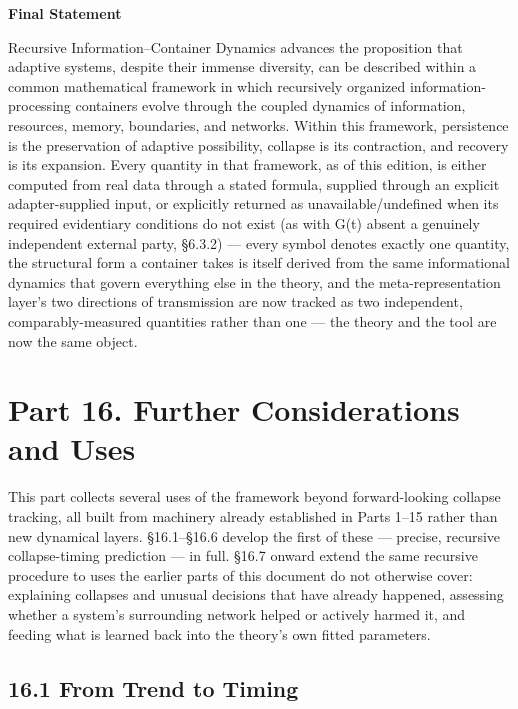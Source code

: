 \documentclass[
]{article}
\begin{document}
\textbf{Final Statement}

Recursive Information--Container Dynamics advances the proposition that
adaptive systems, despite their immense diversity, can be described
within a common mathematical framework in which recursively organized
information-processing containers evolve through the coupled dynamics of
information, resources, memory, boundaries, and networks. Within this
framework, persistence is the preservation of adaptive possibility,
collapse is its contraction, and recovery is its expansion. Every
quantity in that framework, as of this edition, is either computed from
real data through a stated formula, supplied through an explicit
adapter-supplied input, or explicitly returned as unavailable/undefined
when its required evidentiary conditions do not exist (as with G(t)
absent a genuinely independent external party, §6.3.2) --- every symbol
denotes exactly one quantity, the structural form a container takes is
itself derived from the same informational dynamics that govern
everything else in the theory, and the meta-representation layer's two
directions of transmission are now tracked as two independent,
comparably-measured quantities rather than one --- the theory and the
tool are now the same object.

\hypertarget{part-16.-further-considerations-and-uses}{%
\section{Part 16. Further Considerations and
Uses}\label{part-16.-further-considerations-and-uses}}

This part collects several uses of the framework beyond forward-looking
collapse tracking, all built from machinery already established in Parts
1--15 rather than new dynamical layers. §16.1--§16.6 develop the first
of these --- precise, recursive collapse-timing prediction --- in full.
§16.7 onward extend the same recursive procedure to uses the earlier
parts of this document do not otherwise cover: explaining collapses and
unusual decisions that have already happened, assessing whether a
system's surrounding network helped or actively harmed it, and feeding
what is learned back into the theory's own fitted parameters.

\hypertarget{from-trend-to-timing}{%
\subsection{16.1 From Trend to Timing}\label{from-trend-to-timing}}
\end{document}
